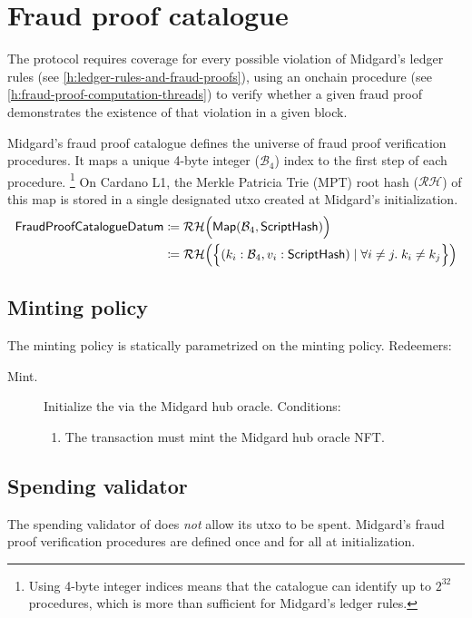 \documentclass[../midgard.tex]{subfiles}
\begin{document}
\section{Fraud proof catalogue}
\label{h:fraud-proof-catalogue}

The protocol requires coverage for every possible violation of Midgard's ledger rules (see \cref{h:ledger-rules-and-fraud-proofs}), using an onchain procedure (see \cref{h:fraud-proof-computation-threads}) to verify whether a given fraud proof demonstrates the existence of that violation in a given block.

Midgard's fraud proof catalogue defines the universe of fraud proof verification procedures.
It maps a unique 4-byte integer ($\mathcal{B}_4$) index to the first step of each procedure.%
\footnote{Using 4-byte integer indices means that the catalogue can identify up to $2^{32}$ procedures, which is more than sufficient for Midgard's ledger rules.}
On Cardano L1, the Merkle Patricia Trie (MPT) root hash ($\mathcal{RH}$) of this map is stored in a single designated utxo created at Midgard's initialization.
\begin{align*}
  \mathsf{FraudProofCatalogueDatum}
      &\coloneq \mathcal{RH}\Bigl( \mathsf{Map}(\mathcal{B}_4, \mathsf{ScriptHash}) \Bigr) \\
      &\coloneq \mathcal{RH}\Bigl(\Bigl\{
        (k_i: \mathcal{B}_4, v_i: \mathsf{ScriptHash}) \mid \forall i \neq j.\; k_i \neq k_j
    \Bigr\}\Bigr)
\end{align*}

\subsection{Minting policy}
\label{h:fraud-proof-catalogue-minting-policy}

The  minting policy is statically parametrized on the  minting policy.
Redeemers:
\begin{description}
    \item[Mint.] Initialize the  via the Midgard hub oracle.
      Conditions:
        \begin{enumerate}
            \item The transaction must mint the Midgard hub oracle NFT.
        \end{enumerate}
\end{description}

\subsection{Spending validator}
\label{h:fraud-proof-catalogue-spending-validator}

The spending validator of  does \emph{not} allow its utxo to be spent.
Midgard's fraud proof verification procedures are defined once and for all at initialization.
\end{document}

